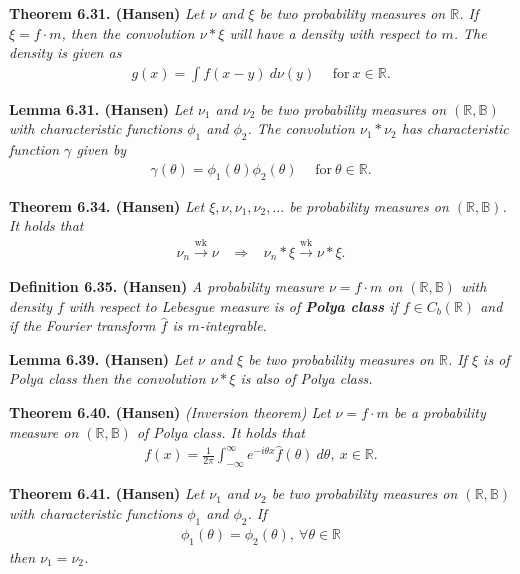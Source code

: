 \documentclass[a4paper,12pt,openany]{book}
\begin{document}
\textbf{Theorem 6.31. (Hansen)} \emph{Let \(\nu\) and \(\xi\) be two probability measures on \(\mathbb{R}\). If \(\xi=f\cdot m\), then the convolution \(\nu*\xi\) will have a density with respect to \(m\). The density is given as}
\begin{align*}
    g(x)=\int f(x-y)\ d\nu(y)\hspace{15pt}\text{for}\ x\in\mathbb{R}.\tag{6.35}
\end{align*}

\textbf{Lemma 6.31. (Hansen)} \emph{Let \(\nu_1\) and \(\nu_2\) be two probability measures on \((\mathbb{R},\mathbb{B})\) with characteristic functions \(\phi_1\) and \(\phi_2\). The convolution \(\nu_1*\nu_2\) has characteristic function \(\gamma\) given by}
\begin{align*}
    \gamma(\theta)=\phi_1(\theta)\phi_2(\theta)\hspace{15pt}\text{for}\ \theta\in\mathbb{R}.\tag{6.37}
\end{align*}

\textbf{Theorem 6.34. (Hansen)} \emph{Let \(\xi,\nu,\nu_1,\nu_2,...\) be probability measures on \((\mathbb{R},\mathbb{B})\). It holds that}
\begin{align*}
    \nu_n\stackrel{\text{wk}}{\to} \nu\hspace{10pt}\Rightarrow\hspace{10pt} \nu_n*\xi\stackrel{\text{wk}}{\to} \nu *\xi.
\end{align*}

\textbf{Definition 6.35. (Hansen)} \emph{A probability measure \(\nu=f\cdot m\) on \((\mathbb{R},\mathbb{B})\) with density \(f\) with respect to Lebesgue measure is of \textbf{Polya class} if \(f\in C_b(\mathbb{R})\) and if the Fourier transform \(\hat{f}\) is \(m\)-integrable.}

\textbf{Lemma 6.39. (Hansen)} \emph{Let \(\nu\) and \(\xi\) be two probability measures on \(\mathbb{R}\). If \(\xi\) is of Polya class then the convolution \(\nu *\xi\) is also of Polya class.}

\textbf{Theorem 6.40. (Hansen)} \emph{(Inversion theorem) Let \(\nu=f\cdot m\) be a probability measure on \((\mathbb{R},\mathbb{B})\) of Polya class. It holds that}
\begin{align*}
    f(x)=\frac{1}{2\pi}\int_{-\infty}^\infty e^{-i\theta x}\hat{f}(\theta)\ d\theta,\ x\in\mathbb{R}.\tag{6.39}
\end{align*}

\textbf{Theorem 6.41. (Hansen)} \emph{Let \(\nu_1\) and \(\nu_2\) be two probability measures on \((\mathbb{R},\mathbb{B})\) with characteristic functions \(\phi_1\) and \(\phi_2\). If}
\begin{align*}
    \phi_1(\theta)=\phi_2(\theta),\ \forall \theta \in\mathbb{R}
\end{align*}
\emph{then \(\nu_1=\nu_2\).}
\end{document}
